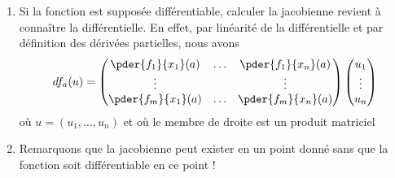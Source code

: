 \begin{remark}
  \begin{enumerate}
  \item Si la fonction est supposée différentiable, calculer la
    jacobienne revient à connaître la différentielle. En effet, par
    linéarité de la différentielle et par définition des dérivées
    partielles, nous avons
    \begin{equation*}
      d f_a (u) =%
      \begin{pmatrix}
        \pder {f_1} {x_1}(a) & \ldots &\pder {f_1} {x_n}(a)\\
        \vdots& & \vdots\\
        \pder {f_m} {x_1}(a) & \ldots &\pder {f_m} {x_n}(a)
      \end{pmatrix}
      \begin{pmatrix}u_1\\\vdots\\u_n\end{pmatrix}
    \end{equation*}
    où $u = (u_1, \ldots, u_n)$ et où le membre de droite est un
    produit matriciel

  \item Remarquons que la jacobienne peut exister en un point donné
    sans que la fonction soit différentiable en ce point !
  \end{enumerate}
\end{remark}

